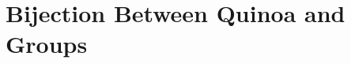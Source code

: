 \documentclass[../gatm.tex]{subfiles}
\begin{document}
\section{Bijection Between Quinoa and Groups}
\end{document}
